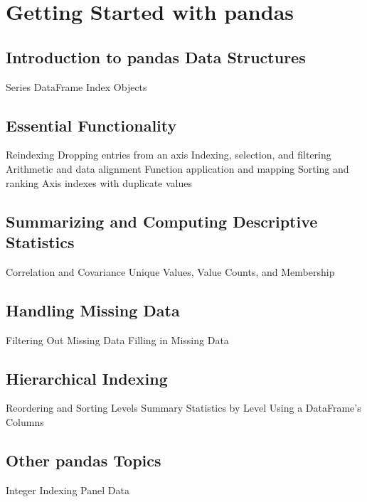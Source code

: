 

\section{Getting Started with pandas}   

     
\subsection{Introduction to pandas Data Structures} 
Series 
DataFrame 
Index Objects 


\subsection{Essential Functionality}
Reindexing 
Dropping entries from an axis 
Indexing, selection, and filtering 
Arithmetic and data alignment 
Function application and mapping 
Sorting and ranking 
Axis indexes with duplicate values 


\subsection{Summarizing and Computing Descriptive Statistics} 
Correlation and Covariance 
Unique Values, Value Counts, and Membership 


\subsection{Handling Missing Data}
Filtering Out Missing Data 
Filling in Missing Data 


\subsection{Hierarchical Indexing}
Reordering and Sorting Levels 
Summary Statistics by Level 
Using a DataFrame’s Columns 
\subsection{Other pandas Topics}
Integer Indexing 
Panel Data 



